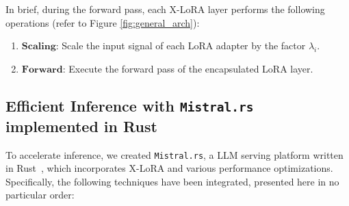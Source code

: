 In brief, during the forward pass, each X-LoRA layer performs the following operations (refer to Figure \ref{fig:general_arch}):

\begin{enumerate}
    \item $\mathbf{Scaling}$: Scale the input signal of each LoRA adapter by the factor $\lambda_i$.
    \item $\mathbf{Forward}$: Execute the forward pass of the encapsulated LoRA layer.
\end{enumerate}

\subsection{Efficient Inference with \texttt{Mistral.rs} implemented in Rust} To accelerate inference, we created \texttt{Mistral.rs}, a LLM serving platform written in Rust~\cite{matsakis2014rust}, which incorporates X-LoRA and various performance optimizations. Specifically, the following techniques have been integrated, presented here in no particular order:

